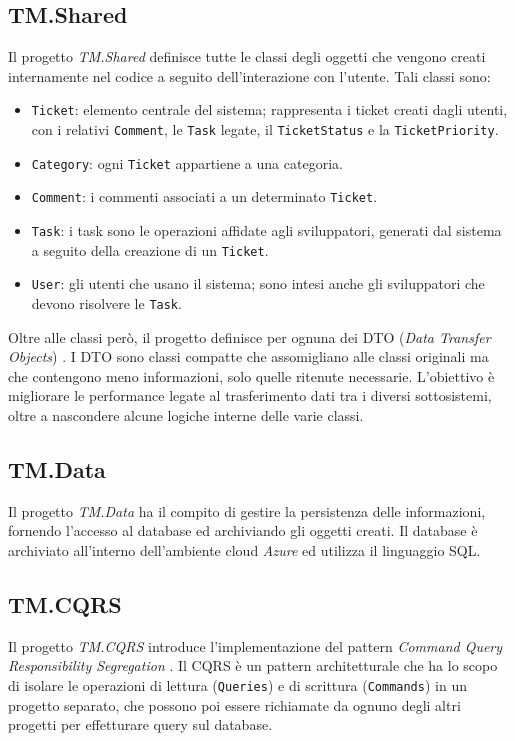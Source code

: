\subsection{TM.Shared}
Il progetto \textit{TM.Shared} definisce tutte le classi degli oggetti che vengono creati internamente nel codice a seguito dell'interazione
con l'utente. Tali classi sono:
\begin{itemize}
    \item \texttt{Ticket}: elemento centrale del sistema; rappresenta i ticket creati dagli utenti, con i relativi \texttt{Comment},
        le \texttt{Task} legate, il \texttt{TicketStatus} e la \texttt{TicketPriority}.
    \item \texttt{Category}: ogni \texttt{Ticket} appartiene a una categoria.
    \item \texttt{Comment}: i commenti associati a un determinato \texttt{Ticket}.
    \item \texttt{Task}: i task sono le operazioni affidate agli sviluppatori, generati dal sistema a seguito della creazione
        di un \texttt{Ticket}.
    \item \texttt{User}: gli utenti che usano il sistema; sono intesi anche gli sviluppatori che devono risolvere le \texttt{Task}.
\end{itemize}
Oltre alle classi però, il progetto definisce per ognuna dei DTO (\textit{Data Transfer Objects}) \cite{microsoft_webapi_ef_part5}.
I DTO sono classi compatte che assomigliano alle classi originali ma che contengono meno informazioni, solo quelle ritenute necessarie. 
L'obiettivo è migliorare le performance legate al trasferimento dati tra i diversi sottosistemi, oltre a nascondere alcune logiche interne delle varie classi.

\subsection{TM.Data}
Il progetto \textit{TM.Data} ha il compito di gestire la persistenza delle informazioni, fornendo l'accesso al database
ed archiviando gli oggetti creati. Il database è archiviato all'interno dell'ambiente cloud \textit{Azure} ed utilizza il linguaggio SQL.

\subsection{TM.CQRS}
Il progetto \textit{TM.CQRS} introduce l'implementazione del pattern \textit{Command Query Responsibility Segregation} \cite{azure_cqrs_msdocs}.
Il CQRS è un pattern architetturale che ha lo scopo di isolare le operazioni di lettura (\texttt{Queries}) e di scrittura (\texttt{Commands})
in un progetto separato, che possono poi essere richiamate da ognuno degli altri progetti per effetturare query sul database.

